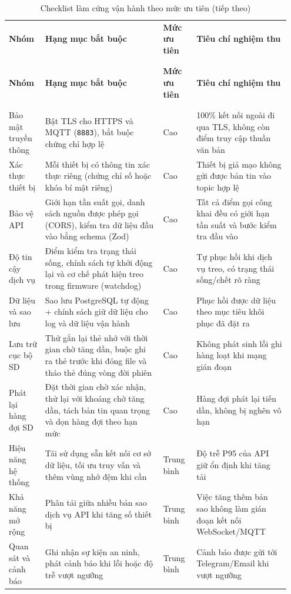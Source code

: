 \documentclass[a4paper]{extarticle}
\newcommand{\thesissettableid}[2]{%
  \renewcommand{\thetable}{#1}%
  \renewcommand{\theHtable}{#2}%
}
\begin{document}
{\thesissettableid{4.11}{tab-ch4-checklist-hardening-production-theo-muc-uu-tien}
\def\LTcaptype{table}
\begin{longtable}{|L{0.125\linewidth}|L{0.396\linewidth}|L{0.115\linewidth}|L{0.318\linewidth}|}
\caption{Checklist làm cứng vận hành theo mức ưu tiên}\label{tab:ch4-checklist-hardening-production-theo-muc-uu-tien}\\
\hline \textbf{Nhóm} & \textbf{Hạng mục bắt buộc} & \textbf{Mức ưu tiên} & \textbf{Tiêu chí nghiệm thu} \\
\\\hline
\endfirsthead
\caption[]{Checklist làm cứng vận hành theo mức ưu tiên (tiếp theo)}\\
\hline \textbf{Nhóm} & \textbf{Hạng mục bắt buộc} & \textbf{Mức ưu tiên} & \textbf{Tiêu chí nghiệm thu} \\
\\\hline
\endhead
\\\hline
\endfoot
\endlastfoot
Bảo mật truyền thông & Bật TLS cho HTTPS và MQTT (\texttt{8883}), bắt
buộc chứng chỉ hợp lệ & Cao & 100\% kết nối ngoài đi qua TLS, không còn
điểm truy cập thuần văn bản \\\hline
Xác thực thiết bị & Mỗi thiết bị có thông tin xác thực riêng
(chứng chỉ số hoặc khóa bí mật riêng) & Cao & Thiết bị giả mạo không gửi
được bản tin vào topic hợp lệ \\\hline
Bảo vệ API & Giới hạn tần suất gọi, danh sách nguồn được phép gọi
(CORS), kiểm tra dữ liệu đầu vào bằng schema (Zod) & Cao & Tất cả điểm
gọi công khai đều có giới hạn tần suất và bước kiểm tra đầu vào \\\hline
Độ tin cậy dịch vụ & Điểm kiểm tra trạng thái sống, chính sách tự khởi
động lại và cơ chế phát hiện treo trong firmware (watchdog) & Cao & Tự
phục hồi khi dịch vụ treo, có trạng thái sống/chết rõ ràng \\\hline
Dữ liệu và sao lưu & Sao lưu PostgreSQL tự động + chính sách giữ dữ liệu
cho log và dữ liệu vận hành & Cao & Phục hồi được dữ liệu theo mục tiêu
khôi phục đã đặt ra \\\hline
Lưu trữ cục bộ SD & Thử gắn lại thẻ nhớ với thời gian chờ tăng dần,
buộc ghi ra thẻ trước khi đóng file và tháo thẻ đúng vòng đời phiên &
Cao & Không phát sinh lỗi ghi hàng loạt khi mạng gián đoạn \\\hline
Phát lại hàng đợi SD & Đặt thời gian chờ xác nhận, thử lại với khoảng
chờ tăng dần, tách bản tin quan trọng và dọn hàng đợi theo hạn mức &
Cao & Hàng đợi phát lại tiến dần, không bị nghẽn vô hạn \\\hline
Hiệu năng hệ thống & Tái sử dụng sẵn kết nối cơ sở dữ liệu, tối ưu truy
vấn và thêm vùng nhớ đệm khi cần & Trung bình & Độ trễ P95 của API giữ
ổn định khi tăng tải \\\hline
Khả năng mở rộng & Phân tải giữa nhiều bản sao dịch vụ API khi tăng số
thiết bị & Trung bình & Việc tăng thêm bản sao không làm gián đoạn kết nối
WebSocket/MQTT \\\hline
Quan sát và cảnh báo & Ghi nhận sự kiện an ninh, phát cảnh báo khi lỗi
hoặc độ trễ vượt ngưỡng & Trung bình & Cảnh báo được gửi tới Telegram/Email khi vượt
ngưỡng \\\hline
\end{longtable}
}
\end{document}
